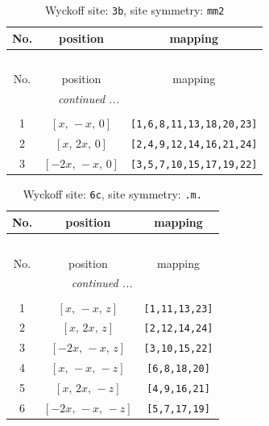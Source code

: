 \documentclass[fleqn,8pt]{jsarticle}
\begin{document}
\begin{longtable}{ccc}
\caption{Wyckoff site: {\tt 3b}, site symmetry: {\tt mm2}}
 \\
 \hline \hline
No. & position & mapping \\ \hline \endfirsthead

\multicolumn{2}{l}{\tablename\ \thetable{}} \\
 \hline \hline
No. & position & mapping \\ \hline \endhead

 \hline \hline
\multicolumn{2}{r}{\footnotesize\it continued ...} \\ \endfoot

 \hline \hline
\multicolumn{2}{r}{} \\ \endlastfoot

1 & $\left[ x,\, - x,\, 0 \right]$ & {\tt [1,6,8,11,13,18,20,23]} \\ \hline
2 & $\left[ x,\, 2 x,\, 0 \right]$ & {\tt [2,4,9,12,14,16,21,24]} \\ \hline
3 & $\left[ - 2 x,\, - x,\, 0 \right]$ & {\tt [3,5,7,10,15,17,19,22]} \\
\end{longtable}
\renewcommand{\arraystretch}{1.2}
\begin{longtable}{ccc}
\caption{Wyckoff site: {\tt 6c}, site symmetry: {\tt .m.}}
 \\
 \hline \hline
No. & position & mapping \\ \hline \endfirsthead

\multicolumn{2}{l}{\tablename\ \thetable{}} \\
 \hline \hline
No. & position & mapping \\ \hline \endhead

 \hline \hline
\multicolumn{2}{r}{\footnotesize\it continued ...} \\ \endfoot

 \hline \hline
\multicolumn{2}{r}{} \\ \endlastfoot

1 & $\left[ x,\, - x,\, z \right]$ & {\tt [1,11,13,23]} \\ \hline
2 & $\left[ x,\, 2 x,\, z \right]$ & {\tt [2,12,14,24]} \\ \hline
3 & $\left[ - 2 x,\, - x,\, z \right]$ & {\tt [3,10,15,22]} \\ \hline
4 & $\left[ x,\, - x,\, - z \right]$ & {\tt [6,8,18,20]} \\ \hline
5 & $\left[ x,\, 2 x,\, - z \right]$ & {\tt [4,9,16,21]} \\ \hline
6 & $\left[ - 2 x,\, - x,\, - z \right]$ & {\tt [5,7,17,19]} \\
\end{longtable}
\end{document}
